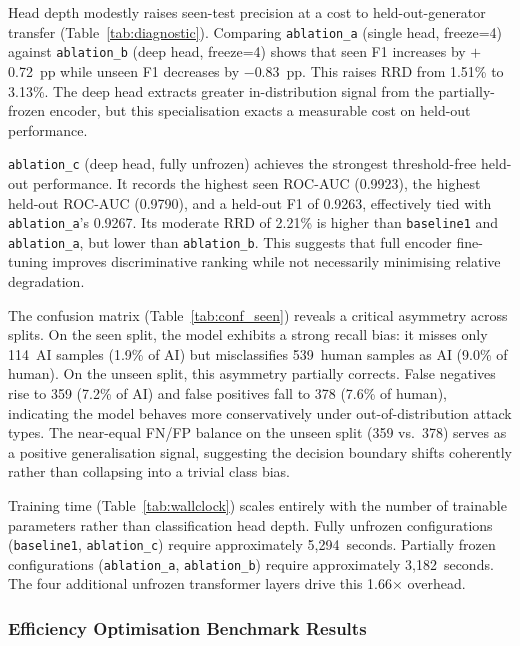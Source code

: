 \documentclass[conference]{IEEEtran}
\begin{document}
Head depth modestly raises seen-test precision at a cost to
held-out-generator transfer (Table~\ref{tab:diagnostic}). Comparing \texttt{ablation\_a} (single head,
freeze=4) against \texttt{ablation\_b} (deep head, freeze=4) shows that
seen F1 increases by $+$0.72~pp while unseen F1 decreases by $-$0.83~pp.
This raises RRD from 1.51\% to 3.13\%. The deep head extracts greater
in-distribution signal from the partially-frozen encoder, but this
specialisation exacts a measurable cost on held-out performance.

\texttt{ablation\_c} (deep head, fully unfrozen) achieves the strongest
threshold-free held-out performance. It records the highest seen ROC-AUC
(0.9923), the highest held-out ROC-AUC (0.9790), and a held-out F1 of
0.9263, effectively tied with \texttt{ablation\_a}'s 0.9267. Its moderate
RRD of 2.21\% is higher than \texttt{baseline1} and \texttt{ablation\_a},
but lower than \texttt{ablation\_b}. This suggests that full encoder
fine-tuning improves discriminative ranking while not necessarily minimising
relative degradation.

The confusion matrix (Table~\ref{tab:conf_seen}) reveals a critical
asymmetry across splits. On the seen split, the model
exhibits a strong recall bias: it misses only 114~AI samples (1.9\% of AI)
but misclassifies 539~human samples as AI (9.0\% of human). On the unseen
split, this asymmetry partially corrects. False negatives rise to 359 (7.2\%
of AI) and false positives fall to 378 (7.6\% of human), indicating the model
behaves more conservatively under out-of-distribution attack types. The
near-equal FN/FP balance on the unseen split (359 vs.\ 378) serves as a
positive generalisation signal, suggesting the decision boundary shifts
coherently rather than collapsing into a trivial class bias.

Training time (Table~\ref{tab:wallclock}) scales entirely with the number of trainable parameters
rather than classification head depth. Fully unfrozen configurations
(\texttt{baseline1}, \texttt{ablation\_c}) require approximately 5,294~seconds.
Partially frozen configurations (\texttt{ablation\_a}, \texttt{ablation\_b})
require approximately 3,182~seconds. The four additional unfrozen transformer
layers drive this 1.66$\times$ overhead.

\subsubsection{Efficiency Optimisation Benchmark Results}
\end{document}
